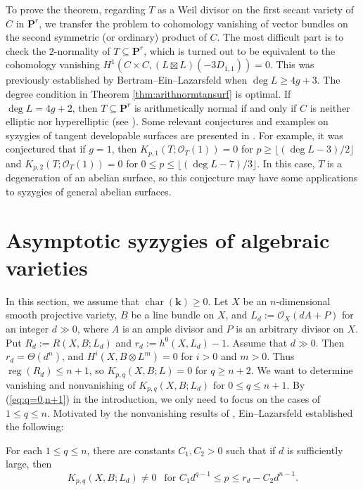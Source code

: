 \documentclass[graybox]{svmult}
\newcommand{\kk}{\mathbf{k}}
\newcommand{\sO}{\mathscr{O}}
\def\nP{\mathbf{P}}
\def\reg{\operatorname{reg}}
\begin{document}
To prove the theorem, regarding $T$ as a Weil divisor on the first secant variety of $C$ in $\nP^r$, we transfer the problem to cohomology vanishing of vector bundles on the second symmetric (or ordinary) product of $C$. The most difficult part is to check the $2$-normality of $T \subseteq \nP^r$, which is turned out to be equivalent to the cohomology vanishing $H^1(C \times C, (L \boxtimes L)(-3D_{1,1})) = 0$. This was previously established by Bertram--Ein--Lazarsfeld \cite{BEL} when $\deg L \geq 4g+3$. The degree condition in Theorem \ref{thm:arithnormtansurf} is optimal. If $\deg L = 4g+2$, then $T \subseteq \nP^r$ is arithmetically normal if and only if $C$ is neither elliptic nor hyperelliptic (see \cite[Remark 4.4]{Park2}). Some relevant conjectures and examples on syzygies of tangent developable surfaces are presented in \cite[Section 4]{Park2}. For example, it was conjectured that if $g=1$, then $K_{p,1}(T; \sO_T(1))=0$ for $p \geq \lfloor (\deg L - 3)/2\rfloor$ and $K_{p,2}(T; \sO_T(1))=0$ for $0 \leq p \leq \lfloor (\deg L - 7)/3 \rfloor$. In this case, $T$ is a degeneration of an abelian surface, so this conjecture may have some applications to syzygies of general abelian surfaces.



\section{Asymptotic syzygies of algebraic varieties}\label{sec:asymptotic}
In this section, we assume that $\operatorname{char}(\kk) \geq 0$. Let $X$ be an $n$-dimensional smooth projective variety, $B$ be a line bundle on $X$, and $L_d:=\sO_X(dA+P)$ for an integer $d \gg 0$, where $A$ is an ample divisor and $P$ is an arbitrary divisor on $X$. Put $R_d:=R(X, B; L_d)$ and $r_d:=h^0(X, L_d)-1$. Assume that $d \gg 0$. Then $r_d = \Theta(d^n)$, and $H^i(X, B \otimes L^m)=0$ for $i>0$ and $m>0$. Thus $\reg (R_d) \leq n+1$, so $K_{p,q}(X, B; L)=0$ for $q \geq n+2$. 
We want to determine vanishing and nonvanishing of $K_{p,q}(X, B; L_d)$ for $0 \leq q \leq n+1$. By (\ref{eq:q=0,n+1}) in the introduction, we only need to focus on the cases of $1 \leq q \leq n$. Motivated by the nonvanishing results of \cite{EGHP, OP}, Ein--Lazarsfeld \cite[Theorem 4.1]{EL2} established the following:

\begin{theorem}\label{thm:ant}
For each $1 \leq q \leq n$, there are constants $C_1, C_2 > 0$ such that if $d$ is sufficiently large, then
$$
K_{p,q}(X, B; L_d) \neq 0~~\text{ for $C_1 d^{q-1} \leq p \leq r_d - C_2 d^{n-1}$}.
$$
\end{theorem}
\end{document}
